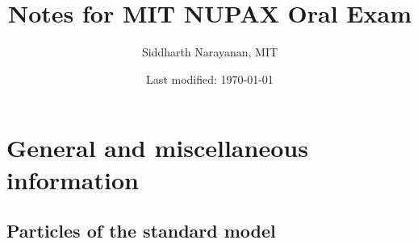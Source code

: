

\pagestyle{fancy}
\chead{\today}
\setcounter{section}{-1}


\title{Notes for MIT NUPAX Oral Exam}
\date{Last modified: \today}
\author{Siddharth Narayanan, MIT}

\maketitle
\clearpage
\tableofcontents
\clearpage

\section{General and miscellaneous information}
\subsection{Particles of the standard model}

